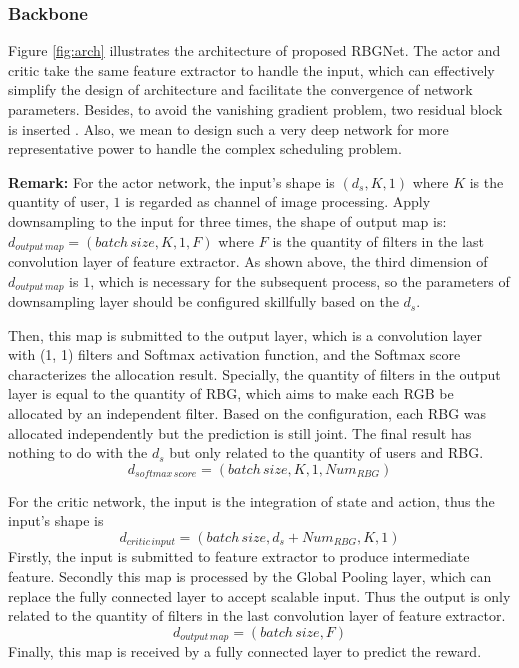 \documentclass[conference,compsocconf]{IEEEtran}
\begin{document}
\subsubsection{Backbone}
Figure \ref{fig:arch} illustrates the architecture of proposed RBGNet. The actor and critic take the same feature extractor to handle the input, which can effectively simplify the design of architecture and facilitate the convergence of network parameters. Besides, to avoid the vanishing gradient problem, two residual block is inserted \cite{He2016Deep}. Also, we mean to design such a very deep network for more representative power to handle the complex scheduling problem. 

\textbf{Remark:}
For the actor network, the input's shape is $( d_s, K, 1)
$
where $ K $ is the quantity of user, $ 1 $ is regarded as channel of image processing.
Apply downsampling to the input for three times, the shape of output map is: 
$
d_{output \, map}=(batch \, size, K, 1, F) 
$
where $ F $ is the quantity of filters in the last convolution layer of feature extractor.
As shown above, the third dimension of $ d_{output \, map} $ is $ 1 $, which is necessary for the subsequent process, 
so the parameters of downsampling layer should be configured skillfully based on the $ d_s $.

Then, this map is submitted to the output layer, which is a convolution layer with (1, 1) filters and Softmax activation function, and 
the Softmax score characterizes the allocation result.
Specially, the quantity of filters in the output layer is equal to the quantity of RBG, which aims to make each RGB be allocated by
an independent filter.
Based on the configuration, each RBG was allocated independently but the prediction is still joint.
The final result has nothing to do with the $ d_s $ but only related to the quantity of users and RBG.
$$
d_{softmax \, score}=(batch \, size, K, 1, Num_{RBG})
$$

For the critic network, the input is the integration of state and action, thus the input's shape is 
$$ 
d_{critic \, input}=(batch \, size, d_s+Num_{RBG}, K, 1) 
$$
Firstly, the input is submitted to feature extractor to produce intermediate feature.
Secondly this map is processed by the Global Pooling layer, which can replace the fully connected layer to accept scalable input. \cite{Lin2013Network}
Thus the output is only related to the quantity of filters in the last convolution layer of feature extractor.
$$
d_{output \, map}=(batch \, size, F) 
$$
Finally, this map is received by a fully connected layer to predict the reward.
\end{document}
